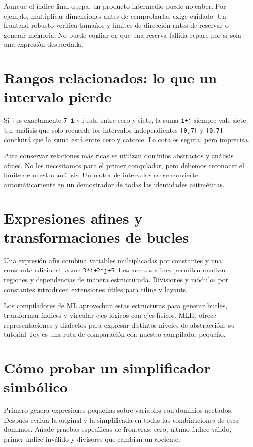 \documentclass[12pt,a4paper,oneside]{report}
\begin{document}
Aunque el índice final quepa, un producto intermedio puede no caber. Por ejemplo, multiplicar dimensiones antes de comprobarlas exige cuidado. Un frontend robusto verifica tamaños y límites de dirección antes de reservar o generar memoria. No puede confiar en que una reserva fallida repare por sí sola una expresión desbordada.

\section{Rangos relacionados: lo que un intervalo pierde}
Si j es exactamente \texttt{7-i} y i está entre cero y siete, la suma \texttt{i+j} siempre vale siete. Un análisis que solo recuerde los intervalos independientes \texttt{[0,7]} y \texttt{[0,7]} concluirá que la suma está entre cero y catorce. La cota es segura, pero imprecisa.

Para conservar relaciones más ricas se utilizan dominios abstractos y análisis afines. No los necesitamos para el primer compilador, pero debemos reconocer el límite de nuestro análisis. Un motor de intervalos no se convierte automáticamente en un demostrador de todas las identidades aritméticas.

\section{Expresiones afines y transformaciones de bucles}
Una expresión afín combina variables multiplicadas por constantes y una constante adicional, como \texttt{3*i+2*j+5}. Los accesos afines permiten analizar regiones y dependencias de manera estructurada. Divisiones y módulos por constantes introducen extensiones útiles para tiling y layouts.

Los compiladores de ML aprovechan estas estructuras para generar bucles, transformar índices y vincular ejes lógicos con ejes físicos. MLIR ofrece representaciones y dialectos para expresar distintos niveles de abstracción; su tutorial Toy es una ruta de comparación con nuestro compilador pequeño. \cite{mlir-toy}

\section{Cómo probar un simplificador simbólico}
Primero genera expresiones pequeñas sobre variables con dominios acotados. Después evalúa la original y la simplificada en todas las combinaciones de esos dominios. Añade pruebas específicas de fronteras: cero, último índice válido, primer índice inválido y divisores que cambian un cociente.
\end{document}
